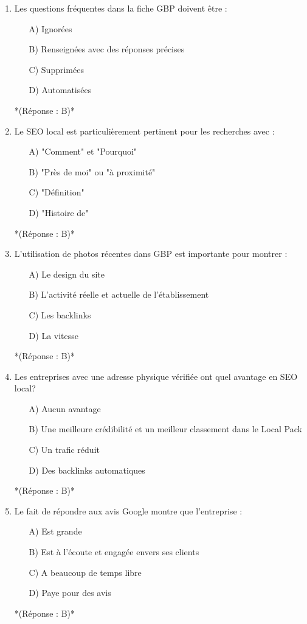 \documentclass[12pt,a4paper,twoside]{report}
\begin{document}
\begin{enumerate}
\item Les questions fréquentes dans la fiche GBP doivent être :
\begin{itemize}
\item[A)] Ignorées
\item[B)] Renseignées avec des réponses précises
\item[C)] Supprimées
\item[D)] Automatisées
\end{itemize}
*(Réponse : B)*

\item Le SEO local est particulièrement pertinent pour les recherches avec :
\begin{itemize}
\item[A)] "Comment" et "Pourquoi"
\item[B)] "Près de moi" ou "à proximité"
\item[C)] "Définition"
\item[D)] "Histoire de"
\end{itemize}
*(Réponse : B)*

\item L'utilisation de photos récentes dans GBP est importante pour montrer :
\begin{itemize}
\item[A)] Le design du site
\item[B)] L'activité réelle et actuelle de l'établissement
\item[C)] Les backlinks
\item[D)] La vitesse
\end{itemize}
*(Réponse : B)*

\item Les entreprises avec une adresse physique vérifiée ont quel avantage en SEO local?
\begin{itemize}
\item[A)] Aucun avantage
\item[B)] Une meilleure crédibilité et un meilleur classement dans le Local Pack
\item[C)] Un trafic réduit
\item[D)] Des backlinks automatiques
\end{itemize}
*(Réponse : B)*

\item Le fait de répondre aux avis Google montre que l'entreprise :
\begin{itemize}
\item[A)] Est grande
\item[B)] Est à l'écoute et engagée envers ses clients
\item[C)] A beaucoup de temps libre
\item[D)] Paye pour des avis
\end{itemize}
*(Réponse : B)*


\end{enumerate}
\end{document}
